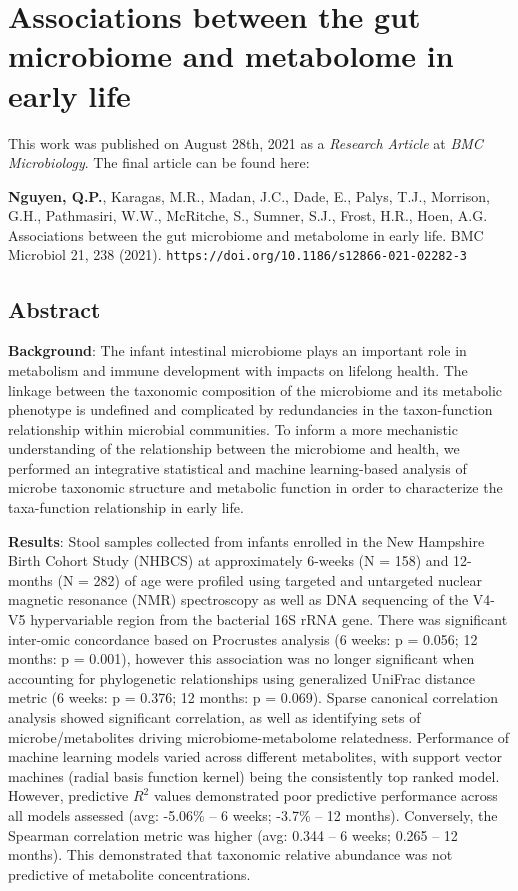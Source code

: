 \chapter{Associations between the gut microbiome and metabolome in early life}
This work was published on August 28th, 2021 as a \emph{Research Article} at \emph{BMC Microbiology}. The final article can be found here: 

\begin{center}
\justifying
\textbf{Nguyen, Q.P.}, Karagas, M.R., Madan, J.C., Dade, E., Palys, T.J., Morrison, G.H., Pathmasiri, W.W., McRitche, S., Sumner, S.J., Frost, H.R., Hoen, A.G. Associations between the gut microbiome and metabolome in early life. BMC Microbiol 21, 238 (2021). \texttt{https://doi.org/10.1186/s12866-021-02282-3}
\end{center}

\section{Abstract}
\textbf{Background}: The infant intestinal microbiome plays an important role in metabolism and immune development with impacts on lifelong health. The linkage between the taxonomic composition of the microbiome and its metabolic phenotype is undefined and complicated by redundancies in the taxon-function relationship within microbial communities. To inform a more mechanistic understanding of the relationship between the microbiome and health, we performed an integrative statistical and machine learning-based analysis of microbe taxonomic structure and metabolic function in order to characterize the taxa-function relationship in early life.

\noindent \textbf{Results}: Stool samples collected from infants enrolled in the New Hampshire Birth Cohort Study (NHBCS) at approximately 6-weeks (N = 158) and 12-months (N = 282) of age were profiled using targeted and untargeted nuclear magnetic resonance (NMR) spectroscopy as well as DNA sequencing of the V4-V5 hypervariable region from the bacterial 16S rRNA gene. There was significant inter-omic concordance based on Procrustes analysis (6 weeks: p = 0.056; 12 months: p = 0.001), however this association was no longer significant when accounting for phylogenetic relationships using generalized UniFrac distance metric (6 weeks: p = 0.376; 12 months: p = 0.069). Sparse canonical correlation analysis showed significant correlation, as well as identifying sets of microbe/metabolites driving microbiome-metabolome relatedness. Performance of machine learning models varied across different metabolites, with support vector machines (radial basis function kernel) being the consistently top ranked model. However, predictive $R^2$ values demonstrated poor predictive performance across all models assessed (avg: -5.06\% -- 6 weeks; -3.7\% -- 12 months). Conversely, the Spearman correlation metric was higher (avg: 0.344 -- 6 weeks; 0.265 -- 12 months). This demonstrated that taxonomic relative abundance was not predictive of metabolite concentrations.

